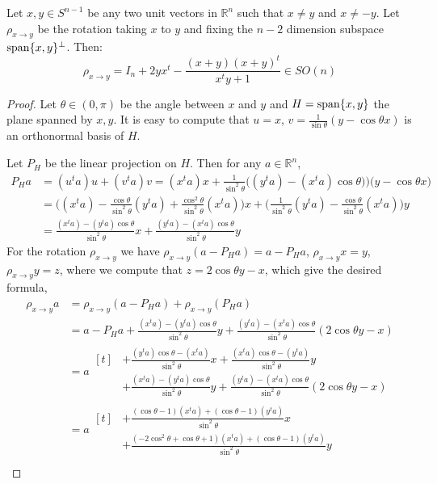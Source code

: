 \begin{computation}\label{com:rotation} Let $x,y\in S^{n-1}$ be any two unit vectors in $\mathbb{R}^n$ such that $x\neq y$ and $x\neq -y$. Let $\rho_{x\to y}$ be the rotation taking $x$ to $y$ and fixing the $n-2$ dimension subspace $\mathrm{span}\{x,y\}^{\perp}$. Then:
\[\rho_{x\to y}=I_n+2yx^t-\frac{(x+y)(x+y)^t}{x^ty+1}\in SO(n)\]
\end{computation}
\begin{proof} Let $\theta\in(0,\pi)$ be the angle between $x$ and $y$ and $H=\mathrm{span}\{x,y\}$ the plane spanned by $x,y$. It is easy to compute that $u=x$, $v=\frac{1}{\sin\theta}(y-\cos\theta x)$ is an orthonormal basis of $H$.

Let $P_H$ be the linear projection on $H$. Then for any $a\in\mathbb{R}^n$,
\begin{align*}
P_Ha&=(u^ta)u+(v^ta)v
=(x^ta)x+\frac{1}{\sin^2\theta}\big((y^ta)-(x^ta)\cos\theta)\big)\big(y-\cos\theta x\big)\\
&=\Big((x^ta)-\frac{\cos\theta}{\sin^2\theta}(y^ta)+\frac{\cos^2\theta}{\sin^2\theta}(x^ta)\Big)x+\Big(\frac{1}{\sin^2\theta}(y^ta)-\frac{\cos\theta}{\sin^2\theta}(x^ta)\Big)y\\
&=\frac{(x^ta)-(y^ta)\cos\theta}{\sin^2\theta}x+\frac{(y^ta)-(x^ta)\cos\theta}{\sin^2\theta}y
\end{align*}
For the rotation $\rho_{x\to y}$ we have
$\rho_{x\to y}(a-P_Ha)=a-P_Ha$, $\rho_{x\to y}x=y$, $\rho_{x\to y}y=z$,
where we compute that $z=2\cos\theta y-x$, which give the desired formula,
\begingroup
\allowdisplaybreaks
\begin{align*}
\rho_{x\to y}a&=\rho_{x\to y}(a-P_Ha)+\rho_{x\to y}(P_Ha)\\
&=a-P_Ha+\frac{(x^ta)-(y^ta)\cos\theta}{\sin^2\theta}y+\frac{(y^ta)-(x^ta)\cos\theta}{\sin^2\theta}(2\cos\theta y-x)\\
&=a\begin{aligned}[t]&+\frac{(y^ta)\cos\theta-(x^ta)}{\sin^2\theta}x+\frac{(x^ta)\cos\theta-(y^ta)}{\sin^2\theta}y\\
&+\frac{(x^ta)-(y^ta)\cos\theta}{\sin^2\theta}y+\frac{(y^ta)-(x^ta)\cos\theta}{\sin^2\theta}(2\cos\theta y-x)\end{aligned}\\
&=a\begin{aligned}[t]&+\frac{(\cos\theta-1)(x^ta)+(\cos\theta-1)(y^ta)}{\sin^2\theta}x\\
&+\frac{(-2\cos^2\theta+\cos\theta+1)(x^ta)+(\cos\theta-1)(y^ta)}{\sin^2\theta}y\end{aligned}\\

\end{align*}
\end{proof}
